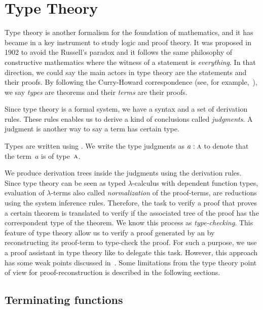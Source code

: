 \documentclass[../main.tex]{subfiles}
\begin{document}
\section{Type Theory}
\label{sec:type-theory}

Type theory is another formalism for the foundation of mathematics, and it has became in a key instrument to study logic and proof theory.
It was proposed in 1902 to avoid the Russell's paradox and it follows
the same philosophy of constructive mathematics where the witness of
a statement is \emph{everything}. In that direction, we could say
the main actors in type theory are the statements and their proofs.
By following the Curry-Howard correspondence (see, for example,~\cite{Wadler-2015}), we say
\emph{types} are theorems and their \emph{terms} are their proofs.

Since type theory is a formal system, we have a syntax and a set of
derivation rules. These rules enables us to derive a kind of conclusions called
\emph{judgments}. A judgment is another way to say a term has certain type.

\begin{notation}
  Types are written using .  We write the type
  judgments as $a : \textsc{a}$ to denote that the term~$a$ is of
  type~$\textsc{a}$.
\end{notation}

We produce derivation trees inside the judgments using the derivation
rules.  Since type theory can be seen as typed $λ$-calculus with
dependent function types, evaluation of $λ$-terms also called
\emph{normalization} of the proof-terms, are reductions using the
system inference rules. Therefore, the task to verify a proof that
proves a certain theorem is translated to verify if the associated
tree of the proof has the correspondent type of the theorem. We know
this process as \emph{type-checking}. This feature of type theory
allow us to verify a proof generated by an \ATP by reconstructing its
proof-term to type-check the proof. For such a purpose, we use a proof
assistant in type theory like \Agda to delegate this task.  However,
this approach has some weak points discussed in~\cite{Bezem2002}. Some
limitations from the type theory point of view for
proof-reconstruction is described in the following sections.


\subsection{Terminating functions}
\label{ssec:structural-recursion}
\end{document}
